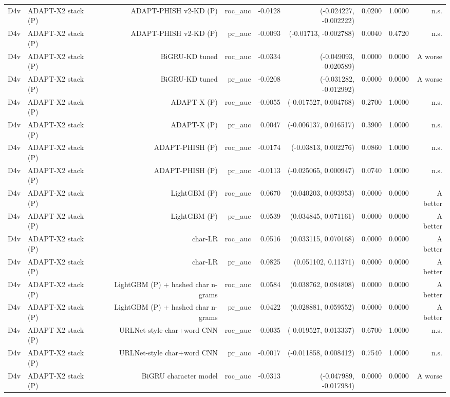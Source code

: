 \begin{table}[t]
\begin{tabular}{llrrrrrrr}
D4v & ADAPT-X2 stack (P) & ADAPT-PHISH v2-KD (P) & roc\_auc & -0.0128 & (-0.024227, -0.002222) & 0.0200 & 1.0000 & n.s. \\
D4v & ADAPT-X2 stack (P) & ADAPT-PHISH v2-KD (P) & pr\_auc & -0.0093 & (-0.01713, -0.002788) & 0.0040 & 0.4720 & n.s. \\
D4v & ADAPT-X2 stack (P) & BiGRU-KD tuned & roc\_auc & -0.0334 & (-0.049093, -0.020589) & 0.0000 & 0.0000 & A worse \\
D4v & ADAPT-X2 stack (P) & BiGRU-KD tuned & pr\_auc & -0.0208 & (-0.031282, -0.012992) & 0.0000 & 0.0000 & A worse \\
D4v & ADAPT-X2 stack (P) & ADAPT-X (P) & roc\_auc & -0.0055 & (-0.017527, 0.004768) & 0.2700 & 1.0000 & n.s. \\
D4v & ADAPT-X2 stack (P) & ADAPT-X (P) & pr\_auc & 0.0047 & (-0.006137, 0.016517) & 0.3900 & 1.0000 & n.s. \\
D4v & ADAPT-X2 stack (P) & ADAPT-PHISH (P) & roc\_auc & -0.0174 & (-0.03813, 0.002276) & 0.0860 & 1.0000 & n.s. \\
D4v & ADAPT-X2 stack (P) & ADAPT-PHISH (P) & pr\_auc & -0.0113 & (-0.025065, 0.000947) & 0.0740 & 1.0000 & n.s. \\
D4v & ADAPT-X2 stack (P) & LightGBM (P) & roc\_auc & 0.0670 & (0.040203, 0.093953) & 0.0000 & 0.0000 & A better \\
D4v & ADAPT-X2 stack (P) & LightGBM (P) & pr\_auc & 0.0539 & (0.034845, 0.071161) & 0.0000 & 0.0000 & A better \\
D4v & ADAPT-X2 stack (P) & char-LR & roc\_auc & 0.0516 & (0.033115, 0.070168) & 0.0000 & 0.0000 & A better \\
D4v & ADAPT-X2 stack (P) & char-LR & pr\_auc & 0.0825 & (0.051102, 0.11371) & 0.0000 & 0.0000 & A better \\
D4v & ADAPT-X2 stack (P) & LightGBM (P) + hashed char n-grams & roc\_auc & 0.0584 & (0.038762, 0.084808) & 0.0000 & 0.0000 & A better \\
D4v & ADAPT-X2 stack (P) & LightGBM (P) + hashed char n-grams & pr\_auc & 0.0422 & (0.028881, 0.059552) & 0.0000 & 0.0000 & A better \\
D4v & ADAPT-X2 stack (P) & URLNet-style char+word CNN & roc\_auc & -0.0035 & (-0.019527, 0.013337) & 0.6700 & 1.0000 & n.s. \\
D4v & ADAPT-X2 stack (P) & URLNet-style char+word CNN & pr\_auc & -0.0017 & (-0.011858, 0.008412) & 0.7540 & 1.0000 & n.s. \\
D4v & ADAPT-X2 stack (P) & BiGRU character model & roc\_auc & -0.0313 & (-0.047989, -0.017984) & 0.0000 & 0.0000 & A worse \\

\end{tabular}
\end{table}
